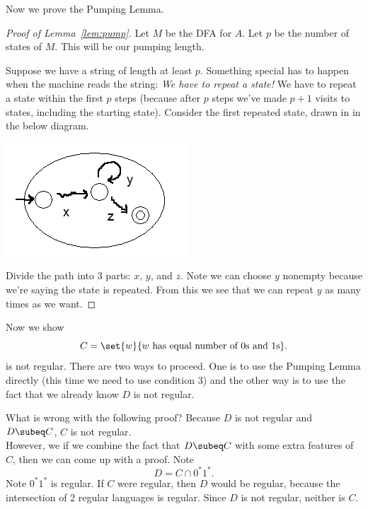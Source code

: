 Now we prove the Pumping Lemma.
\begin{proof}[Proof of Lemma~\ref{lem:pump}]
Let $M$ be the DFA for $A$. Let $p$ be the number of states of $M$. This will be our pumping length. %

Suppose we have a string of length at least $p$. 
Something special has to happen when the machine reads the string: {\it We have to repeat a state!} %
We have to repeat a state within the first $p$ steps (because after $p$ steps we've made $p+1$ visits to states, including the starting state). Consider the first repeated state, drawn in in the below diagram.

\begin{center}
\includegraphics{3-6}
\end{center}

Divide the path into 3 parts: $x$, $y$, and $z$. %
Note we can choose $y$ nonempty because we're saying the state is repeated. %
From this we see that we can repeat $y$ as many times as we want.
\end{proof}
\begin{ex}
Now we show 
\[
C=\set{w}{w\text{ has equal number of 0s and 1s}}.
\]
is not regular. There are two ways to proceed. One is to use the Pumping Lemma directly (this time we need to use condition $3$) and the other way is to use the fact that we already know $D$ is not regular.

What is wrong with the following proof? Because $D$ is not regular and $D\subeq C$, $C$ is not regular.\\

\vskip0.15in
However, we if we combine the fact that $D\subeq C$ with some extra features of $C$, then we can come up with a proof. Note
\[D=C\cap 0^*1^*.\]
Note $0^*1^*$ is regular. If $C$ were regular, then $D$ would be regular, because the intersection of 2 regular languages is regular. Since $D$ is not regular, neither is $C$.\\


\end{ex}